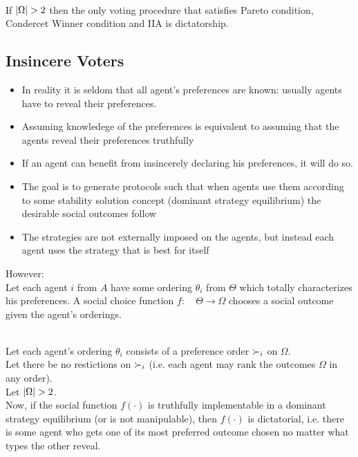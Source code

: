 \begin{theorem}\\
If $\lvert\Omega\rvert>2$ then the only voting procedure that satisfies Pareto condition, Condercet Winner condition and IIA is dictatorship.
\end{theorem}
\subsection{Insincere Voters}
\begin{itemize}
\item In reality it is seldom that all agent's preferences are known: usually agents have to reveal their preferences.
\item Assuming knowledege of the preferences is equivalent to assuming that the agents reveal their preferences truthfully
\item If an agent can benefit from insincerely declaring his preferences, it will do so.
\item The goal is to generate protocols such that when agents use them according to some stability solution concept (dominant strategy equilibrium) the desirable social outcomes follow
\item The strategies are not externally imposed on the agents, but instead each agent uses the strategy that is best for itself
\end{itemize}
However:\\

Let each agent $i$ from $A$ have some ordering $\theta_i$ from $\Theta$ which totally characterizes his preferences. A social choice function $f:\quad \Theta \rightarrow \Omega$ chooses a social outcome given the agent's orderings.

\begin{theorem}\\
Let each agent's ordering $\theta_i$ consists of a preference order $\succ_i$ on $\Omega$.\\
Let there be no restictions on $\succ_i$ (i.e. each agent may rank the outcomes $\Omega$ in any order).\\
Let $\lvert\Omega\rvert > 2$.\\
Now, if the social function $f(\cdot)$ is truthfully implementable in a dominant strategy equilibrium (or is not manipulable), then $f(\cdot)$ is dictatorial, i.e. there is some agent who gets one of its most preferred outcome chosen no matter what types the other reveal.
\end{theorem}

